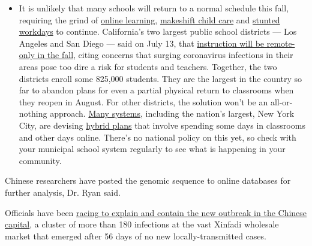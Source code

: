 \begin{itemize}
  \begin{itemize}
  \tightlist
  \item
    It is unlikely that many schools will return to a normal schedule
    this fall, requiring the grind of
    \href{https://www.nytimes.com/2020/06/05/us/coronavirus-education-lost-learning.html?action=click\&pgtype=Article\&state=default\&region=MAIN_CONTENT_3\&context=storylines_faq}{online
    learning},
    \href{https://www.nytimes.com/2020/05/29/us/coronavirus-child-care-centers.html?action=click\&pgtype=Article\&state=default\&region=MAIN_CONTENT_3\&context=storylines_faq}{makeshift
    child care} and
    \href{https://www.nytimes.com/2020/06/03/business/economy/coronavirus-working-women.html?action=click\&pgtype=Article\&state=default\&region=MAIN_CONTENT_3\&context=storylines_faq}{stunted
    workdays} to continue. California's two largest public school
    districts --- Los Angeles and San Diego --- said on July 13, that
    \href{https://www.nytimes.com/2020/07/13/us/lausd-san-diego-school-reopening.html?action=click\&pgtype=Article\&state=default\&region=MAIN_CONTENT_3\&context=storylines_faq}{instruction
    will be remote-only in the fall}, citing concerns that surging
    coronavirus infections in their areas pose too dire a risk for
    students and teachers. Together, the two districts enroll some
    825,000 students. They are the largest in the country so far to
    abandon plans for even a partial physical return to classrooms when
    they reopen in August. For other districts, the solution won't be an
    all-or-nothing approach.
    \href{https://bioethics.jhu.edu/research-and-outreach/projects/eschool-initiative/school-policy-tracker/}{Many
    systems}, including the nation's largest, New York City, are
    devising
    \href{https://www.nytimes.com/2020/06/26/us/coronavirus-schools-reopen-fall.html?action=click\&pgtype=Article\&state=default\&region=MAIN_CONTENT_3\&context=storylines_faq}{hybrid
    plans} that involve spending some days in classrooms and other days
    online. There's no national policy on this yet, so check with your
    municipal school system regularly to see what is happening in your
    community.
  \end{itemize}
\end{itemize}

Chinese researchers have posted the genomic sequence to online databases
for further analysis, Dr. Ryan said.

Officials have been
\href{https://www.nytimes.com/2020/06/17/world/asia/coronavirus-beijing-china.html}{racing
to explain and contain the new outbreak in the Chinese capital}, a
cluster of more than 180 infections at the vast Xinfadi wholesale market
that emerged after 56 days of no new locally-transmitted cases.

